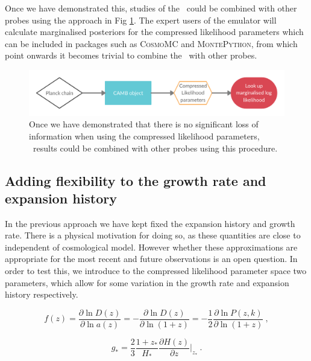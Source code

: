 \documentclass[preprintnumbers,prd,superscriptaddress,notitlepage,nofootinbib] {revtex4-1}
\begin{document}
Once we have demonstrated this, studies of the \lyaf\ could be combined with other
probes using the approach in Fig \ref{fig:param_map3}. The expert users of the emulator
will calculate marginalised posteriors for the compressed likelihood parameters which
can be included in packages such as \textsc{CosmoMC} and \textsc{MontePython}, from
which point onwards it becomes trivial to combine the \lyaf\ with other probes.

\begin{figure}[ht]
    \begin{center}
     \includegraphics[scale=0.2]{Figures/Marginalised_compressed.png}
    \end{center}
    \caption{Once we have demonstrated that there is no significant loss of
    information when using the compressed likelihood parameters, \lyaf\ results
    could be combined with other probes using this procedure.}
    \label{fig:param_map3}
\end{figure}

\subsection{Adding flexibility to the growth rate and expansion history}
\label{ss:extensions}
In the previous approach we have kept fixed the expansion history and growth rate.
There is a physical motivation for doing so, as these quantities are close to
independent of cosmological model. However whether these approximations are appropriate
for the most recent and future observations is an open question. In order to test this,
we introduce to the compressed likelihood parameter space two parameters, which allow for
some variation in the growth rate and expansion history respectively.

\begin{equation}
    f(z) = \frac{\partial \ln D(z)}{\partial \ln a(z)}
     = - \frac{\partial \ln D(z)}{\partial \ln (1+z)}
     = - \frac{1}{2} \frac{\partial \ln P(z,k)}{\partial \ln (1+z)} ~,
\end{equation}

\begin{equation}
    g_\ast = \frac{2}{3} \frac{1+z_\ast}{H_\ast} 
         \frac{\partial H(z)}{\partial z} \Bigr\rvert_{z_\ast} ~.
\end{equation}
\end{document}
